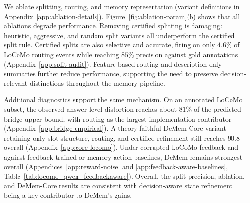 \documentclass{article}
\theoremstyle{plain}
\theoremstyle{definition}
\theoremstyle{remark}
\begin{document}

We ablate splitting, routing, and memory representation
(variant definitions in Appendix~\ref{app:ablation-details}).
Figure~\ref{fig:ablation-param}(b) shows that all ablations degrade
performance. Removing certified splitting is damaging: heuristic,
aggressive, and random split variants all underperform the certified
split rule. Certified splits are also selective and accurate, firing on
only \(4.6\%\) of LoCoMo routing events while reaching \(85\%\) precision
against gold annotations (Appendix~\ref{app:split-audit}). Feature-based
routing and description-only summaries further reduce performance,
supporting the need to preserve decision-relevant distinctions throughout
the memory pipeline.

Additional diagnostics support the same mechanism. On an annotated LoCoMo
subset, the observed answer-level distortion reaches about \(81\%\) of the
predicted bridge upper bound, with routing as the largest implementation
contributor (Appendix~\ref{app:bridge-empirical}). A theory-faithful
DeMem-Core variant retaining only slot structure, routing, and
certified refinement still reaches 90.8 overall
(Appendix~\ref{app:core-locomo}). Under corrupted LoCoMo feedback and
against feedback-trained or memory-action baselines,
DeMem remains strongest overall
(Appendices~\ref{app:reward-noise} and
\ref{app:feedback-aware-baselines},
Table~\ref{tab:locomo_qwen_feedbackaware}).
Overall, the split-precision, ablation, and DeMem-Core results are consistent with decision-aware state refinement being a key contributor to DeMem’s gains.
\end{document}
